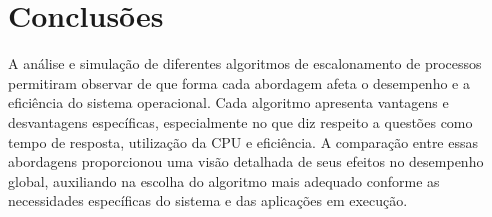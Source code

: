 \documentclass[
	12pt,				%
	oneside,   	        %
	a4paper,			%
	english,			%
	french,				%
	spanish,			%
	brazil,				%
	]{pacotes/abntex2}
\begin{document}
\section{Conclusões}
\label{sec:conclusoes}
A análise e simulação de diferentes algoritmos de escalonamento de processos permitiram observar de que forma cada abordagem afeta o desempenho e a eficiência do sistema operacional. Cada algoritmo apresenta vantagens e desvantagens específicas, especialmente no que diz respeito a questões como tempo de resposta, utilização da CPU e eficiência. A comparação entre essas abordagens proporcionou uma visão detalhada de seus efeitos no desempenho global, auxiliando na escolha do algoritmo mais adequado conforme as necessidades específicas do sistema e das aplicações em execução.

\postextual
\renewcommand{\bibsection}{%
\section{\bibname}
\bibmark
\prebibhook}


\end{document}
